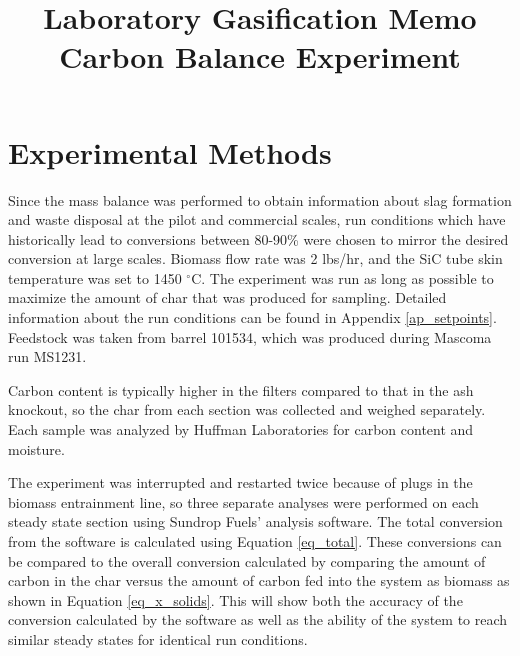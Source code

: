 \documentclass[11pt,twocolumn]{article}
\date{}
\title{Laboratory Gasification Memo\\Carbon Balance Experiment \vspace{-6ex}}
\begin{document}

\section*{Experimental Methods}

Since the mass balance was performed to obtain information about slag formation and waste disposal at the pilot and commercial scales, run conditions which have historically lead to conversions between 80-90\% were chosen to mirror the desired conversion at large scales.  Biomass flow rate was 2 lbs/hr, and the SiC tube skin temperature was set to 1450 $^\circ$C.  The experiment was run as long as possible to maximize the amount of char that was produced for sampling.  Detailed information about the run conditions can be found in Appendix \ref{ap_setpoints}.  Feedstock was taken from barrel 101534, which was produced during Mascoma run MS1231.

Carbon content is typically higher in the filters compared to that in the ash knockout, so the char from each section was collected and weighed separately.  Each sample was analyzed by Huffman Laboratories for carbon content and moisture.

The experiment was interrupted and restarted twice because of plugs in the biomass entrainment line, so three separate analyses were performed on each steady state section using Sundrop Fuels' analysis software.  The total conversion from the software is calculated using Equation \ref{eq_total}.  These conversions can be compared to the overall conversion calculated by comparing the amount of carbon in the char versus the amount of carbon fed into the system as biomass as shown in Equation \ref{eq_x_solids}.  This will show both the accuracy of the conversion calculated by the software as well as the ability of the system to reach similar steady states for identical run conditions.
\end{document}

